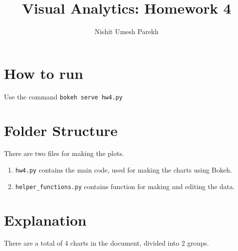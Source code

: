 \documentclass[11pt,handout]{article}
\title{Visual Analytics: Homework 4}
\author{Nishit Umesh Parekh}
\begin{document}
\maketitle

\section{How to run}

Use the command \texttt{bokeh serve hw4.py}\\

\section{Folder Structure}

There are two files for making the plots.

\begin{enumerate}
	\item \texttt{hw4.py} contains the main code, used for making the charts using Bokeh.
	\item \texttt{helper\_functions.py} contains function for making and editing the data.
\end{enumerate}

\section{Explanation}

There are a total of 4 charts in the document, divided into 2 groups.
\end{document}
